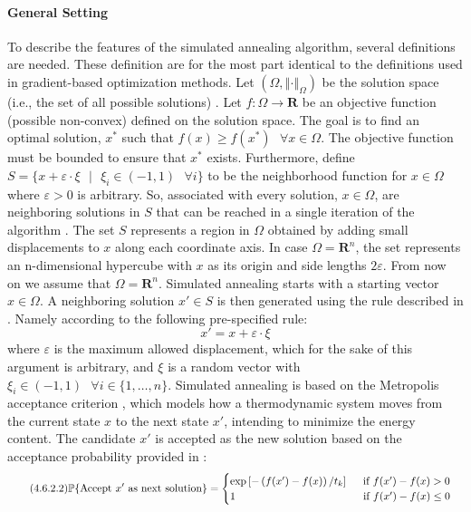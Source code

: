 \paragraph{General Setting}
To describe the features of the simulated annealing algorithm, several definitions are needed. These definition are for the most part identical to the definitions used in gradient-based optimization methods. Let $\left(\Omega,\left\Vert\cdot\right\Vert_{\Omega}\right)$ be the solution space (i.e., the set of all possible solutions) . Let $f: \Omega \rightarrow \mathbf{R}$ be an objective function (possible non-convex) defined on the solution space. The goal is to find an optimal solution, $x^{*}$ such that $f(x) \geq f(x^{*}) \text{ }\forall x \in \Omega.$ The objective function must be bounded to ensure that $x^{*}$ exists. Furthermore, define $S = \{x + \varepsilon\cdot\xi \text{ }|\text{ } \xi_{i} \in \left(-1, 1\right) \text{ } \forall i\}$ to be the neighborhood function for $x \in \Omega$ where $\varepsilon > 0$ is arbitrary. So, associated with every solution, $x \in \Omega$, are neighboring solutions in $S$ that can be reached in a single iteration of the algorithm \cite[2]{metropolis1953equation}. The set $S$ represents a region in $\Omega$ obtained by adding small displacements to $x$ along each coordinate axis. In case $\Omega = \mathbf{R}^n$, the set represents an n-dimensional hypercube with $x$ as its origin and side lengths $2\varepsilon.$ From now on we assume that $\Omega = \mathbf{R}^n.$ Simulated annealing starts with a starting vector $x \in \Omega.$ A neighboring solution $x' \in S$ is then generated using the rule described in \cite[2]{metropolis1953equation}. 
\newpage 
Namely according to the following pre-specified rule:
\begin{equation}\tag{4.6.2.1}
x' = x + \varepsilon\cdot\xi  
\end{equation}
where $\varepsilon$ is the maximum allowed displacement, which for the sake of this argument is arbitrary, and $\xi$ is a random vector with $\xi_{i} \in \left(-1,1\right)\text{ } \forall i \in \{1,\ldots,n\}.$ Simulated annealing is based on the Metropolis acceptance criterion \parencite[2]{metropolis1953equation}, which models how a thermodynamic system moves from the current state $x$ to the next state $x'$, intending to minimize the energy content. The candidate $x'$ is accepted as the new solution based on the acceptance probability provided in \cite[289]{Henderson2003}:
\begin{equation}\tag{4.6.2.2}
\mathbb{P}\{\text{Accept $x'$ as next solution}\} = 
    \begin{cases}
        \exp\left[-\left(f(x')-f(x)\right)/t_{k}\right] \hspace{0.5cm}\text{if $f(x')-f(x) > 0$}\\
        1 \text{\hspace{4.1cm} if $f(x')-f(x) \leq 0$}
    \end{cases}
\end{equation}
